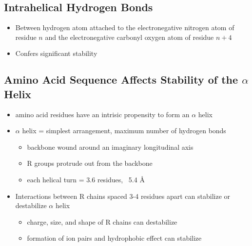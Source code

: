 \documentclass[10pt]{article}
\begin{document}
\subsection*{Intrahelical Hydrogen Bonds}
\begin{itemize}
    \item Between hydrogen atom attached to the electronegative nitrogen atom of residue $n$ and the electronegative carbonyl oxygen atom of residue $n + 4$
    \item Confers significant stability
\end{itemize}

\subsection*{Amino Acid Sequence Affects Stability of the $\alpha$ Helix}
\begin{itemize}
    \item amino acid residues have an intrisic propensity to form an $\alpha$ helix
    \item $\alpha$ helix = simplest arrangement, maximum number of hydrogen bonds
    \begin{itemize}
        \item backbone wound around an imaginary longitudinal axis
        \item R groups protrude out from the backbone
        \item each helical turn = 3.6 residues, ~5.4 \r{A}
    \end{itemize}
    \item Interactions between R chains spaced 3-4 residues apart can stabilize or destabilize $\alpha$ helix
    \begin{itemize}
        \item charge, size, and shape of R chains can destabilize
        \item formation of ion pairs and hydrophobic effect can stabilize
    \end{itemize}
\end{itemize}
\end{document}
